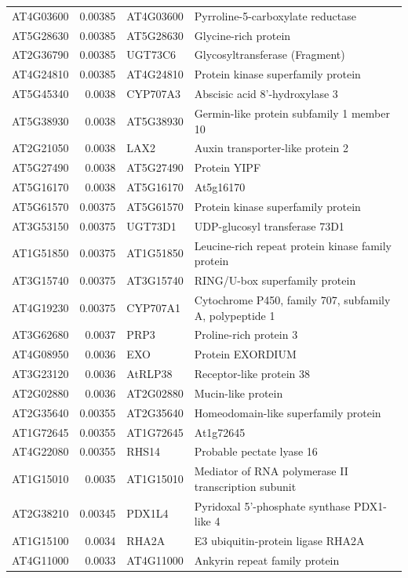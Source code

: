 \documentclass[11pt]{article}
\begin{document}
\begin{center}
\begin{tabular}{lrll}
AT4G03600 & 0.00385 & AT4G03600 & Pyrroline-5-carboxylate reductase\\
AT5G28630 & 0.00385 & AT5G28630 & Glycine-rich protein\\
AT2G36790 & 0.00385 & UGT73C6 & Glycosyltransferase (Fragment)\\
AT4G24810 & 0.00385 & AT4G24810 & Protein kinase superfamily protein\\
AT5G45340 & 0.0038 & CYP707A3 & Abscisic acid 8'-hydroxylase 3\\
AT5G38930 & 0.0038 & AT5G38930 & Germin-like protein subfamily 1 member 10\\
AT2G21050 & 0.0038 & LAX2 & Auxin transporter-like protein 2\\
AT5G27490 & 0.0038 & AT5G27490 & Protein YIPF\\
AT5G16170 & 0.0038 & AT5G16170 & At5g16170\\
AT5G61570 & 0.00375 & AT5G61570 & Protein kinase superfamily protein\\
AT3G53150 & 0.00375 & UGT73D1 & UDP-glucosyl transferase 73D1\\
AT1G51850 & 0.00375 & AT1G51850 & Leucine-rich repeat protein kinase family protein\\
AT3G15740 & 0.00375 & AT3G15740 & RING/U-box superfamily protein\\
AT4G19230 & 0.00375 & CYP707A1 & Cytochrome P450, family 707, subfamily A, polypeptide 1\\
AT3G62680 & 0.0037 & PRP3 & Proline-rich protein 3\\
AT4G08950 & 0.0036 & EXO & Protein EXORDIUM\\
AT3G23120 & 0.0036 & AtRLP38 & Receptor-like protein 38\\
AT2G02880 & 0.0036 & AT2G02880 & Mucin-like protein\\
AT2G35640 & 0.00355 & AT2G35640 & Homeodomain-like superfamily protein\\
AT1G72645 & 0.00355 & AT1G72645 & At1g72645\\
AT4G22080 & 0.00355 & RHS14 & Probable pectate lyase 16\\
AT1G15010 & 0.0035 & AT1G15010 & Mediator of RNA polymerase II transcription subunit\\
AT2G38210 & 0.00345 & PDX1L4 & Pyridoxal 5'-phosphate synthase PDX1-like 4\\
AT1G15100 & 0.0034 & RHA2A & E3 ubiquitin-protein ligase RHA2A\\
AT4G11000 & 0.0033 & AT4G11000 & Ankyrin repeat family protein\\

\end{tabular}
\end{center}
\end{document}
